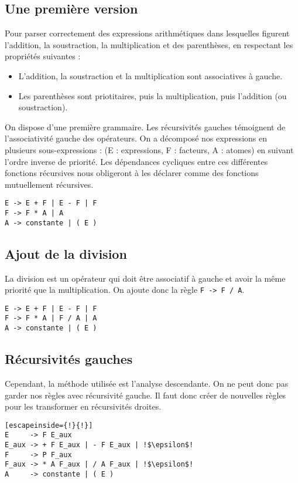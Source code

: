 \documentclass[11pt]{article}
\begin{document}
\subsection{Une première version}
Pour parser correctement des expressions arithmétiques dans lesquelles figurent l'addition, la soustraction, la multiplication et des parenthèses, en respectant les propriétés suivantes :
\begin{itemize}
\item L'addition, la soustraction et la multiplication sont associatives à gauche.
\item Les parenthèses sont priotitaires, puis la multiplication, puis l'addition (ou soustraction).
\end{itemize}

On dispose d'une première grammaire. Les récursivités gauches témoignent de l'associativité gauche des opérateurs. On a décomposé nos expressions en plusieurs sous-expressions : (E : expressions, F : facteurs, A : atomes) en suivant l'ordre inverse de priorité. Les dépendances cycliques entre ces différentes fonctions récursives nous obligeront à les déclarer comme des fonctions mutuellement récursives.

\begin{lstlisting}
E -> E + F | E - F | F
F -> F * A | A
A -> constante | ( E )
\end{lstlisting}

\subsection{Ajout de la division}
La division est un opérateur qui doit être associatif à gauche et avoir la même priorité que la multiplication. On ajoute donc la règle \texttt{F -> F / A}.
\begin{lstlisting}
E -> E + F | E - F | F
F -> F * A | F / A | A
A -> constante | ( E )
\end{lstlisting}

\subsection{Récursivités gauches}
Cependant, la méthode utilisée est l'analyse descendante. On ne peut donc pas garder nos règles avec récursivité gauche. Il faut donc créer de nouvelles règles pour les transformer en récursivités droites.

\begin{lstlisting}[escapeinside={!}{!}]
E     -> F E_aux
E_aux -> + F E_aux | - F E_aux | !$\epsilon$!
F     -> P F_aux
F_aux -> * A F_aux | / A F_aux | !$\epsilon$!
A     -> constante | ( E )
\end{lstlisting}
\end{document}
